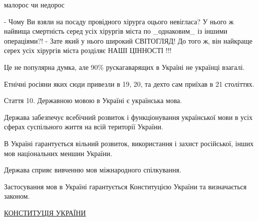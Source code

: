 \begin{itemize}
 
малорос чи недорос

 
- Чому Ви взяли на посаду провідного хірурга оцього невігласа? У нього ж найвища смертність серед усіх хірургів міста по _однаковим_ із іншими операціями?!
- Зате який у нього широкий СВІТОГЛЯД! До того ж, він найкраще серех усіх хірургів міста розділяє НАШІ ЦІННОСТІ !!!

 

Це не популярна думка, але 90\% рускагаварящих в Україні не українці взагалі.

Етнічні росіяни яких сюди привезли в 19, 20, та дехто сам приїхав в 21
століттях.

 

Стаття 10. Державною мовою в Україні є українська мова.

Держава забезпечує всебічний розвиток і функціонування української мови в усіх
сферах суспільного життя на всій території України.

В Україні гарантується вільний розвиток, використання і захист російської,
інших мов національних меншин України.

Держава сприяє вивченню мов міжнародного спілкування.

Застосування мов в Україні гарантується Конституцією України та визначається
законом.

\href{https://zakon.rada.gov.ua/laws/show/254к/96-вр}{%
КОНСТИТУЦІЯ УКРАЇНИ%
}


 


\end{itemize}
